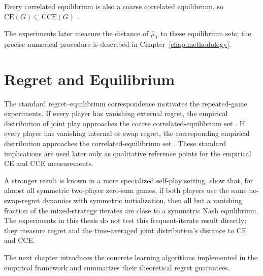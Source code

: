 Every correlated equilibrium is also a coarse correlated equilibrium, so
\(\mathrm{CE}(G)\subseteq\mathrm{CCE}(G)\)
\citep{leme_convergence_2024}.

The experiments later measure the distance of \(\widehat{\mu}_T\) to these
equilibrium sets; the precise numerical procedure is described in
Chapter~\ref{chap:methodology}.


\section{Regret and Equilibrium}
\label{sec:theoretical-connections}

The standard regret--equilibrium correspondence motivates the repeated-game
experiments. If every player has vanishing external regret, the empirical
distribution of joint play approaches the coarse correlated-equilibrium set
\citep{chen_hedging_2020}. If every player has vanishing internal or swap
regret, the corresponding empirical distribution approaches the
correlated-equilibrium set \citep{hart_simple_2000,blum_external_2007}. These
standard implications are used later only as qualitative reference points for
the empirical CE and CCE measurements.

A stronger result is known in a more specialized self-play setting.
\citet{leme_convergence_2024} show that, for almost all symmetric two-player
zero-sum games, if both players use the same no-swap-regret dynamics with
symmetric initialization, then all but a vanishing fraction of the
mixed-strategy iterates are close to a symmetric Nash equilibrium. The
experiments in this thesis do not test this frequent-iterate result directly;
they measure regret and the time-averaged joint distribution's distance to CE
and CCE.

The next chapter introduces the concrete learning algorithms implemented in
the empirical framework and summarizes their theoretical regret guarantees.
